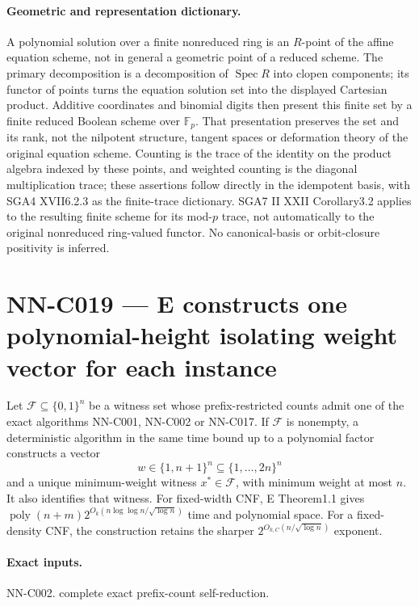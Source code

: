 \paragraph{Geometric and representation dictionary.}
A polynomial solution over a finite nonreduced ring is an $R$-point of the affine equation scheme, not in general a geometric point of a reduced scheme. The primary decomposition is a decomposition of $\operatorname{Spec}R$ into clopen components; its functor of points turns the equation solution set into the displayed Cartesian product. Additive coordinates and binomial digits then present this finite set by a finite reduced Boolean scheme over $\mathbb F_p$. That presentation preserves the set and its rank, not the nilpotent structure, tangent spaces or deformation theory of the original equation scheme. Counting is the trace of the identity on the product algebra indexed by these points, and weighted counting is the diagonal multiplication trace; these assertions follow directly in the idempotent basis, with SGA4 XVII6.2.3 as the finite-trace dictionary. SGA7 II XXII Corollary3.2 applies to the resulting finite scheme for its mod-$p$ trace, not automatically to the original nonreduced ring-valued functor. No canonical-basis or orbit-closure positivity is inferred.



\section{NN-C019 --- E constructs one polynomial-height isolating weight vector for each instance}
\begin{proposition}[NN-C019]
Let $\mathcal F\subseteq\{0,1\}^n$ be a witness set whose prefix-restricted counts admit one of the exact algorithms NN-C001, NN-C002 or NN-C017. If $\mathcal F$ is nonempty, a deterministic algorithm in the same time bound up to a polynomial factor constructs a vector
\[
 w\in\{1,n+1\}^n\subseteq\{1,\ldots,2n\}^n
\]
and a unique minimum-weight witness $x^*\in\mathcal F$, with minimum weight at most $n$. It also identifies that witness. For fixed-width CNF, E Theorem1.1 gives $\operatorname{poly}(n+m)2^{O_k(n\log\log n/\sqrt{\log n})}$ time and polynomial space. For a fixed-density CNF, the construction retains the sharper $2^{O_{k,C}(n/\sqrt{\log n})}$ exponent.
\end{proposition}
\paragraph{Exact inputs.}
NN-C002. complete exact prefix-count self-reduction.

